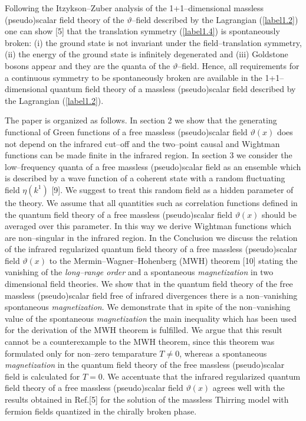 \documentclass[a4paper,12pt] {article}
\begin{document}
Following the Itzykson--Zuber analysis of the 1+1--dimensional
massless (pseudo)scalar field theory of the $\vartheta$--field
described by the Lagrangian (\ref{label1.2}) one can show [5] that the
translation symmetry (\ref{label1.4}) is spontaneously broken: (i) the
ground state is not invariant under the field--translation symmetry,
(ii) the energy of the ground state is infinitely degenerated and
(iii) Goldstone bosons appear and they are the quanta of the
$\vartheta$--field. Hence, all requirements for a continuous symmetry
to be spontaneously broken are available in the 1+1--dimensional
quantum field theory of a massless (pseudo)scalar field described by
the Lagrangian (\ref{label1.2}).

The paper is organized as follows. In section 2 we show that the
generating functional of Green functions of a free massless
(pseudo)scalar field $\vartheta(x)$ does not depend on the infrared
cut--off and the two--point causal and Wightman functions can be made
finite in the infrared region. In section 3 we consider the
low--frequency quanta of a free massless (pseudo)scalar field as an
ensemble which is described by a wave function of a coherent state
with a random fluctuating field $\eta(k^1)$ [9]. We suggest to treat
this random field as a hidden parameter of the theory. We assume that
all quantities such as correlation functions defined in the quantum
field theory of a free massless (pseudo)scalar field $\vartheta(x)$
should be averaged over this parameter. In this way we derive Wightman
functions which are non--singular in the infrared region. In the
Conclusion we discuss the relation of the infrared regularized quantum
field theory of a free massless (pseudo)scalar field $\vartheta(x)$ to
the Mermin--Wagner--Hohenberg (MWH) theorem [10] stating the vanishing
of the {\it long--range order} and a spontaneous {\it magnetization}
in two dimensional field theories. We show that in the quantum field
theory of the free massless (pseudo)scalar field free of infrared
divergences there is a non--vanishing spontaneous {\it magnetization}.
We demonstrate that in spite of the non--vanishing value of the
spontaneous {\it magnetization} the main inequality which has been
used for the derivation of the MWH theorem is fulfilled. We argue that
this result cannot be a counterexample to the MWH theorem, since this
theorem was formulated only for non--zero temparature $T \neq 0$,
whereas a spontaneous {\it magnetization} in the quantum field theory
of the free massless (pseudo)scalar field is calculated for $T=0$. We
accentuate that the infrared regularized quantum field theory of a
free massless (pseudo)scalar field $\vartheta(x)$ agrees well with the
results obtained in Ref.[5] for the solution of the massless Thirring
model with fermion fields quantized in the chirally broken phase.
\end{document}
